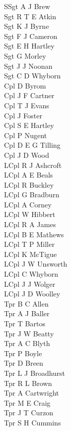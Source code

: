 \begin{multicols}{2}
  \noindent
  SSgt A J Brew \\
  Sgt R T E Atkin \\
  Sgt K J Byrne \\
  Sgt F J Cameron \\
  Sgt E H Hartley \\
  Sgt G Morley \\
  Sgt J J Noonan \\
  Sgt C D Whyborn \\
  Cpl D Byrom \\
  Cpl J F Cartner \\
  Cpl T J Evans \\
  Cpl J Foster \\
  Cpl S E Hartley \\
  Cpl P Nugent \\
  Cpl D E G Tilling \\
  Cpl J D Wood \\
  LCpl R J Ashcroft \\
  LCpl A E Beals \\
  LCpl R Buckley \\
  LCpl G Bradburn \\
  LCpl A Corney \\
  LCpl W Hibbert \\
  LCpl R A James \\
  LCpl B E Mathews \\
  LCpl T P Miller \\
  LCpl K McTigue \\
  LCpl J W Unsworth \\
  LCpl C Whyborn \\
  LCpl J J Wolger \\
  LCpl J D Woolley \\
  Tpr B C Allen \\
  Tpr A J Baller \\
  Tpr T Bartos \\
  Tpr J W Beatty \\
  Tpr A C Blyth \\
  Tpr P Boyle \\
  Tpr D Breen \\
  Tpr L J Broadhurst \\
  Tpr R L Brown \\
  Tpr A Cartwright \\
  Tpr M E Craig \\
  Tpr J T Curzon \\
  Tpr S H Cummins \\

\end{multicols}
